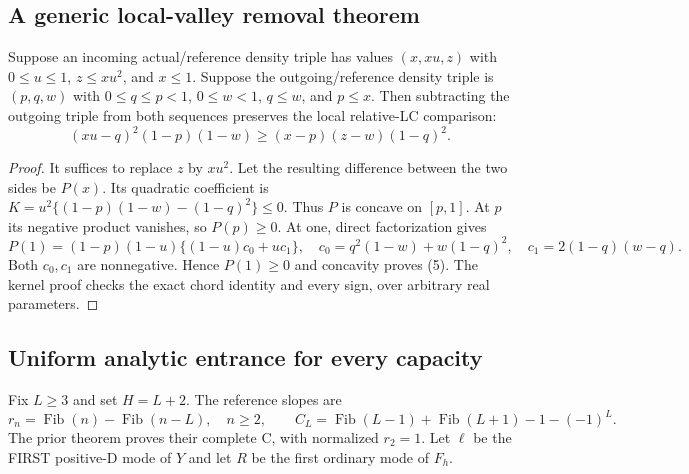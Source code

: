 \subsection*{A generic local-valley removal theorem}
\begin{lemma}
Suppose an incoming actual/reference density triple has values
$(x,xu,z)$ with $0\le u\le1$, $z\le xu^2$, and $x\le1$.
Suppose the outgoing/reference density triple is $(p,q,w)$ with
$0\le q\le p<1$, $0\le w<1$, $q\le w$, and $p\le x$.
Then subtracting the outgoing triple from both sequences preserves
the local relative-LC comparison:
\[
 (xu-q)^2(1-p)(1-w)\ge(x-p)(z-w)(1-q)^2.              \tag{5}
\]
\end{lemma}
\begin{proof}
It suffices to replace $z$ by $xu^2$.  Let the resulting difference
between the two sides be $P(x)$.  Its quadratic coefficient is
$K=u^2\{(1-p)(1-w)-(1-q)^2\}\le0$.
Thus $P$ is concave on $[p,1]$.  At $p$ its negative product
vanishes, so $P(p)\ge0$.  At one, direct factorization gives
\[
 P(1)=(1-p)(1-u)\{(1-u)c_0+uc_1\},
 \quad c_0=q^2(1-w)+w(1-q)^2,\quad c_1=2(1-q)(w-q).
\]
Both $c_0,c_1$ are nonnegative.  Hence $P(1)\ge0$ and
concavity proves (5).  The kernel proof checks the exact chord identity
and every sign, over arbitrary real parameters.
\end{proof}

\subsection*{Uniform analytic entrance for every capacity}
Fix $L\ge3$ and set $H=L+2$.
The reference slopes are
\[
 r_n=\operatorname{Fib}(n)-\operatorname{Fib}(n-L),\quad n\ge2,
 \qquad C_L=\operatorname{Fib}(L-1)+\operatorname{Fib}(L+1)
                                      -1-(-1)^L.        \tag{6}
\]
The prior theorem proves their complete C, with normalized $r_2=1$.
Let $\ell$ be the FIRST positive-D mode of $Y$ and let $R$ be
the first ordinary mode of $F_h$.

